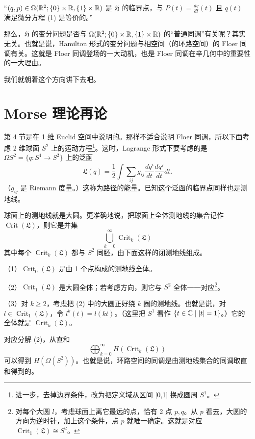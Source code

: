 “$(q,p)\in\Omega(\mathbb{R}^{2};\{0\}\times\mathbb{R},\{1\}\times\mathbb{R})$ 是 $\mathfrak{H}$ 的临界点，与 $P(t)=\frac{dq}{dt}(t)$ 且 $q(t)$ 满足微分方程 (1) 是等价的。”

那么，$\mathfrak{H}$ 的变分问题是否与 $\Omega(\mathbb{R}^{2};\{0\}\times\mathbb{R},\{1\}\times\mathbb{R})$ 的“普通同调”有关呢？其实无关。也就是说，Hamilton 形式的变分问题与相空间（的环路空间）的 Floer 同调有关。这就是 Floer 同调登场的一大动机，也是 Floer 同调在辛几何中的重要性的一大理由。

我们就朝着这个方向讲下去吧。

\section{Morse 理论再论}

第 4 节是在 1 维 Euclid 空间中说明的。那样不适合说明 Floer 同调，所以下面考虑 2 维球面 $S^{2}$ 上的运动方程\footnote{进一步，去掉边界条件，改为把定义域从区间 [0,1] 换成圆周 $S^{1}$。}。这时，Lagrange 形式下要考虑的是 $\Omega S^{2}=\{q:S^{1}\to S^{2}\}$ 上的泛函
\[ \mathfrak{L}(q)=\frac{1}{2}\int\sum_{ij}g_{ij}\frac{dq^{i}}{dt}\frac{dq^{j}}{dt}dt. \]
（$g_{ij}$ 是 Riemann 度量。）这称为路径的能量。已知这个泛函的临界点同样也是测地线。

球面上的测地线就是大圆。更准确地说，把球面上全体测地线的集合记作 $\operatorname{Crit}(\mathfrak{L})$，则它是并集
\[ \bigcup_{k=0}^{\infty}\operatorname{Crit}_{k}(\mathfrak{L}) \tag{2} \]
其中每个 $\operatorname{Crit}_{k}(\mathfrak{L})$ 都与 $S^{2}$ 同胚，由下面这样的闭测地线组成。

（1）$\operatorname{Crit}_{0}(\mathfrak{L})$ 是由 1 个点构成的测地线全体。

（2）$\operatorname{Crit}_{1}(\mathfrak{L})$ 是大圆全体；若考虑方向，则它与 $S^{2}$ 全体一一对应\footnote{对每个大圆 $l$，考虑球面上离它最远的点，恰有 2 点 $p,q$。从 $p$ 看去，大圆的方向为逆时针，加上这个条件，点 $p$ 就唯一确定。这就是对应 $\operatorname{Crit}_{1}(\mathfrak{L})\cong S^{2}$。}。

（3）对 $k\ge 2$，考虑把 (2) 中的大圆正好绕 $k$ 圈的测地线。也就是说，对 $l\in\operatorname{Crit}_{1}(\mathfrak{L})$，令 $l^{k}(t)=l(kt)$。（这里把 $S^{1}$ 看作 $\{t\in\mathbb{C}\mid |t|=1\}$。）它的全体就是 $\operatorname{Crit}_{k}(\mathfrak{L})$。

对应分解 (2)，从直和
\[ \bigoplus_{k=0}^{\infty}H(\operatorname{Crit}_{k}(\mathfrak{L})) \tag{3} \]
可以得到 $H(\Omega(S^{2}))$。也就是说，环路空间的同调是由测地线集合的同调取直和得到的。

